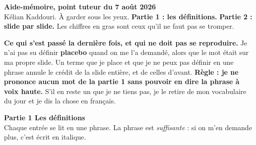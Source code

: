 \documentclass[9pt,a4paper]{article}
\begin{document}
{\color{navy}\Large\bfseries Aide-mémoire, point tuteur du 7 août 2026}\\[2pt]
{\footnotesize Kélian Kaddouri. À garder sous les yeux. \textbf{Partie 1 : les définitions.}
\textbf{Partie 2 : slide par slide.} Les chiffres en gras sont ceux qu'il ne faut pas se tromper.}

\vspace{4pt}
\begin{alerte}
\footnotesize
\textbf{Ce qui s'est passé la dernière fois, et qui ne doit pas se reproduire.} Je n'ai pas su
définir \textbf{placebo} quand on me l'a demandé, alors que le mot était sur ma propre slide.
Un terme que je place et que je ne peux pas définir en une phrase annule le crédit de la
slide entière, et de celles d'avant. \textbf{Règle : je ne prononce aucun mot de la partie 1
sans pouvoir en dire la phrase à voix haute.} S'il en reste un que je ne tiens pas, je le
retire de mon vocabulaire du jour et je dis la chose en français.
\end{alerte}

\vspace{3pt}
{\color{navy}\large\bfseries Partie 1 \textemdash{} Les définitions}\\
{\footnotesize Chaque entrée se lit en une phrase. La phrase est \emph{suffisante} : si on
m'en demande plus, c'est écrit en italique.}
\end{document}

